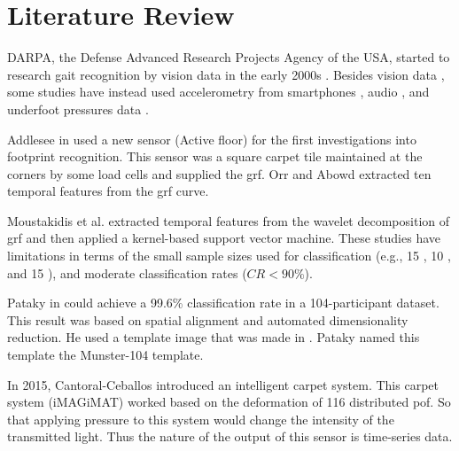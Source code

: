 \section{Literature Review}

DARPA, the Defense Advanced Research Projects Agency of the USA, started to research gait recognition by vision data in the early 2000s \cite{Connor2018BiometricFeatures}. Besides vision data \cite{Chen2006GaitModel}, some studies have instead used accelerometry from smartphones \cite{Mantyjarvi2005IdentifyingAccelerometers}, audio \cite{Geiger2013Gait-basedFeatures}, and underfoot pressures data \cite{Nakajima2000Footprint-BasedRecognition}. 







Addlesee in \cite{Addlesee1997TheFloor} used a new sensor (Active floor) for the first investigations into footprint recognition. This sensor was a square carpet tile maintained at the corners by some load cells and supplied the \gls{grf}. Orr and Abowd \cite{Orr2000TheTracking} extracted ten temporal features from the \gls{grf} curve. 

Moustakidis et al. \cite{Moustakidis2008SubjectSignals} extracted temporal features from the wavelet decomposition of \gls{grf} and then applied a kernel-based support vector machine. These studies have limitations in terms of the small sample sizes used for classification (e.g., 15 \cite{Orr2000TheTracking}, 10 \cite{Moustakidis2008SubjectSignals}, and 15 \cite{MiddletonARecognition}), and moderate classification rates ($CR < 90\%$).

Pataky in \cite{Pataky2012GaitIndividuals} could achieve a 99.6\% classification rate in a 104-participant dataset. This result was based on spatial alignment and automated dimensionality reduction. He used a template image that was made in \cite{Pataky2011AnEvaluation}. Pataky named this template the Munster-104 template.

In 2015, Cantoral-Ceballos \cite{Cantoral-Ceballos2015IntelligentEnvironments} introduced an intelligent carpet system. This carpet system (iMAGiMAT) worked based on the deformation of 116 distributed \gls{pof}. So that applying pressure to this system would change the intensity of the transmitted light. Thus the nature of the output of this sensor is time-series data.
 
